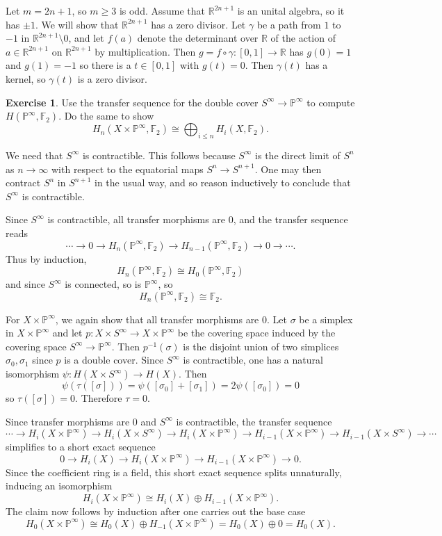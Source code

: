\documentclass[10pt]{article}
\newcommand{\RR}{\mathbb{R}}
\newcommand{\PP}{\mathbb P}
\newcommand{\FF}{\mathbb F}
\theoremstyle{definition}
\newtheorem{exer}{Exercise}
\begin{document}
Let $m = 2n + 1$, so $m \geq 3$ is odd.
Assume that $\RR^{2n + 1}$ is an unital algebra, so it has $\pm 1$.
We will show that $\RR^{2n + 1}$ has a zero divisor.
Let $\gamma$ be a path from $1$ to $-1$ in $\RR^{2n + 1} \setminus 0$, and let $f(a)$ denote the determinant over $\RR$ of the action of $a \in \RR^{2n + 1}$ on $\RR^{2n + 1}$ by multiplication.
Then $g = f \circ \gamma: [0, 1] \to \RR$ has $g(0) = 1$ and $g(1) = -1$ so there is a $t \in [0, 1]$ with $g(t) = 0$.
Then $\gamma(t)$ has a kernel, so $\gamma(t)$ is a zero divisor.

\begin{exer}
Use the transfer sequence for the double cover $S^\infty \to \PP^\infty$ to compute $H(\PP^\infty, \FF_2)$.
Do the same to show
$$H_n(X \times \PP^\infty, \FF_2) \cong \bigoplus_{i \leq n} H_i(X, \FF_2).$$
\end{exer}

We need that $S^\infty$ is contractible.
This follows because $S^\infty$ is the direct limit of $S^n$ as $n \to \infty$ with respect to the equatorial maps $S^n \to S^{n+1}$.
One may then contract $S^n$ in $S^{n+1}$ in the usual way, and so reason inductively to conclude that $S^\infty$ is contractible.

Since $S^\infty$ is contractible, all transfer morphisms are $0$, and the transfer sequence reads
$$\cdots \to 0 \to H_n(\PP^\infty, \FF_2) \to H_{n-1}(\PP^\infty, \FF_2) \to 0 \to \cdots.$$
Thus by induction,
$$H_n(\PP^\infty, \FF_2) \cong H_0(\PP^\infty, \FF_2)$$
and since $S^\infty$ is connected, so is $\PP^\infty$, so
$$H_n(\PP^\infty, \FF_2) \cong \FF_2.$$

For $X \times \PP^\infty$, we again show that all transfer morphisms are $0$.
Let $\sigma$ be a simplex in $X \times \PP^\infty$ and let $p: X \times S^\infty \to X \times \PP^\infty$ be the covering space induced by the covering space $S^\infty \to \PP^\infty$.
Then $p^{-1}(\sigma)$ is the disjoint union of two simplices $\sigma_0,\sigma_1$ since $p$ is a double cover.
Since $S^\infty$ is contractible, one has a natural isomorphism $\psi: H(X \times S^\infty) \to H(X)$. Then
$$\psi(\tau([\sigma])) = \psi([\sigma_0] + [\sigma_1]) = 2\psi([\sigma_0]) = 0$$
so $\tau([\sigma]) = 0$. Therefore $\tau = 0$.

Since transfer morphisms are $0$ and $S^\infty$ is contractible, the transfer sequence
$$\cdots \to H_i(X \times \PP^\infty) \to H_i(X \times S^\infty) \to H_i(X \times \PP^\infty) \to H_{i-1}(X \times \PP^\infty) \to H_{i-1}(X \times S^\infty) \to \cdots$$
simplifies to a short exact sequence
$$0 \to H_i(X) \to H_i(X \times \PP^\infty) \to H_{i-1}(X \times \PP^\infty) \to 0.$$
Since the coefficient ring is a field, this short exact sequence splits unnaturally, inducing an isomorphism
$$H_i(X \times \PP^\infty) \cong H_i(X) \oplus H_{i-1}(X \times \PP^\infty).$$
The claim now follows by induction after one carries out the base case
$$H_0(X \times \PP^\infty) \cong H_0(X) \oplus H_{-1}(X \times \PP^\infty) = H_0(X) \oplus 0 = H_0(X).$$
\end{document}
